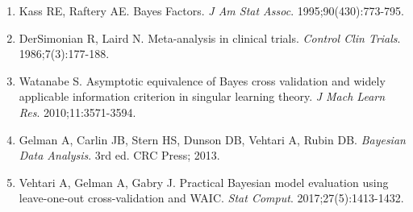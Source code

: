 \documentclass[11pt]{article}
\begin{document}
\begin{enumerate}
    \item Kass RE, Raftery AE. Bayes Factors. \textit{J Am Stat Assoc}. 1995;90(430):773-795.
    \item DerSimonian R, Laird N. Meta-analysis in clinical trials. \textit{Control Clin Trials}. 1986;7(3):177-188.
    \item Watanabe S. Asymptotic equivalence of Bayes cross validation and widely applicable information criterion in singular learning theory. \textit{J Mach Learn Res}. 2010;11:3571-3594.
    \item Gelman A, Carlin JB, Stern HS, Dunson DB, Vehtari A, Rubin DB. \textit{Bayesian Data Analysis}. 3rd ed. CRC Press; 2013.
    \item Vehtari A, Gelman A, Gabry J. Practical Bayesian model evaluation using leave-one-out cross-validation and WAIC. \textit{Stat Comput}. 2017;27(5):1413-1432.
\end{enumerate}
\end{document}
